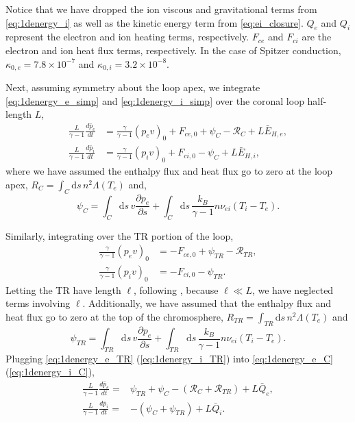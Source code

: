 \documentclass[apj]{emulateapj}
\begin{document}
	Notice that we have dropped the ion viscous and gravitational terms from  \autoref{eq:1denergy_i} as well as the kinetic energy term from \autoref{eq:ei_closure}. $Q_{e}$ and $Q_{i}$ represent the electron and ion heating terms, respectively. $F_{ce}$ and $F_{ci}$ are the electron and ion heat flux terms, respectively. In the case of Spitzer conduction, $\kappa_{0,e}=7.8\times10^{-7}$ and $\kappa_{0,i}=3.2\times10^{-8}$.
	\par Next, assuming symmetry about the loop apex, we integrate \autoref{eq:1denergy_e_simp} and \autoref{eq:1denergy_i_simp} over the coronal loop half-length $L$,
	\begin{align}
		\frac{L}{\gamma - 1}\frac{d \bar{p}_e}{dt} &= \frac{\gamma}{\gamma - 1}(p_ev)_0 + F_{ce,0} + \psi_C - \mathcal{R}_C + L\bar{E}_{H,e},\label{eq:1denergy_e_C} \\[0.5em]
		\frac{L}{\gamma - 1}\frac{d \bar{p}_i}{dt} &= \frac{\gamma}{\gamma - 1}(p_iv)_0 + F_{ci,0} - \psi_C + L\bar{E}_{H,i},\label{eq:1denergy_i_C}
	\end{align}
	where we have assumed the enthalpy flux and heat flux go to zero at the loop apex, $R_C=\int_C\mathrm{d}s\,n^2\Lambda(T_e)$ and,
	\begin{equation} 
		\psi_C=\int_C\mathrm{d}s\,v\frac{\partial p_e}{\partial s} + \int_C\mathrm{d}s\,\frac{k_B}{\gamma - 1}n\nu_{ei}(T_i - T_e).
	\end{equation}
	\par Similarly, integrating over the TR portion of the loop,
	\begin{align}
		\frac{\gamma}{\gamma - 1}(p_ev)_0 &= - F_{ce,0} + \psi_{TR} - \mathcal{R}_{TR}, \label{eq:1denergy_e_TR} \\[0.5em]
		\frac{\gamma}{\gamma - 1}(p_iv)_0 &=  - F_{ci,0} - \psi_{TR}. \label{eq:1denergy_i_TR}
	\end{align}
	Letting the TR have length $\ell$, following \citet{klimchuk_highly_2008}, because $\ell\ll L$, we have neglected terms involving $\ell$. Additionally, we have assumed that the enthalpy flux and heat flux go to zero at the top of the chromosphere, $R_{TR}=\int_{TR}\mathrm{d}s\,n^2\Lambda(T_e)$ and
	\begin{equation}
		\psi_{TR}=\int_{TR}\mathrm{d}s\,v\frac{\partial p_e}{\partial s} + \int_{TR}\mathrm{d}s\,\frac{k_B}{\gamma - 1}n\nu_{ei}(T_i - T_e).
	\end{equation}
	Plugging \autoref{eq:1denergy_e_TR} (\autoref{eq:1denergy_i_TR}) into \autoref{eq:1denergy_e_C} (\autoref{eq:1denergy_i_C}),
	\begin{align}
		\frac{L}{\gamma - 1}\frac{d\bar{p}_e}{dt} =& \psi_{TR} + \psi_C -(\mathcal{R}_C + \mathcal{R}_{TR}) + L\bar{Q}_{e},\label{eq:0d_press_e_sub} \\[0.5em]
		\frac{L}{\gamma - 1}\frac{d\bar{p}_i}{dt} =& -(\psi_{C} + \psi_{TR}) +  L\bar{Q}_{i}.\label{eq:0d_press_i_sub}
	\end{align}
\end{document}
